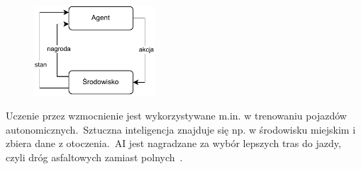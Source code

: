\begin{figure}[H]
    \centering
    \includegraphics[width=0.4\textwidth]{images/reinforcemen}
    \label{fig:reinforcemenet}
\end{figure}

Uczenie przez wzmocnienie jest wykorzystywane m.in. w trenowaniu pojazdów autonomicznych.\ Sztuczna inteligencja znajduje się np. w środowisku miejskim i zbiera dane z otoczenia.\ AI jest nagradzane za wybór lepszych tras do jazdy, czyli dróg asfaltowych zamiast polnych~\cite{AiScience, Mahesh2018}.


